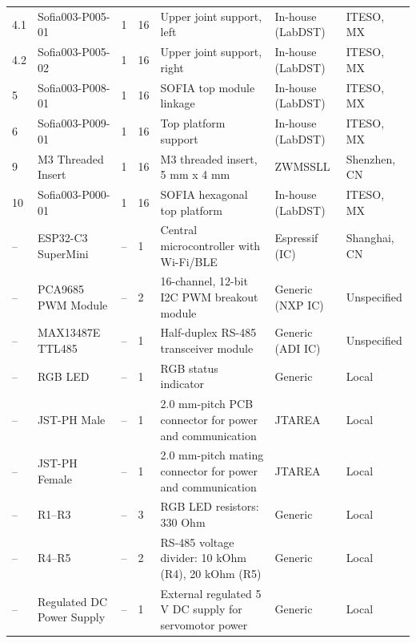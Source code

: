 \documentclass[lettersize,journal]{IEEEtran}
\begin{document}
\begin{table}[!t]
\begin{tabularx}{\columnwidth}{@{}P{0.8cm} P{2.0cm} P{0.5cm} P{0.5cm} P{2.4cm} P{1.1cm} P{0.8cm}@{}}
			4.1 & Sofia003-P005-01 & 1 & 16 &
			Upper joint support, left &
			In-house (LabDST) & ITESO, MX \\
			
			4.2 & Sofia003-P005-02 & 1 & 16 &
			Upper joint support, right &
			In-house (LabDST) & ITESO, MX \\
			
			5 & Sofia003-P008-01 & 1 & 16 &
			SOFIA top module linkage &
			In-house (LabDST) & ITESO, MX \\
			
			6 & Sofia003-P009-01 & 1 & 16 &
			Top platform support &
			In-house (LabDST) & ITESO, MX \\
			
			9 & M3 Threaded Insert & 1 & 16 &
			M3 threaded insert, 5 mm x 4 mm &
			ZWMSSLL & Shenzhen, CN \\
			
			10 & Sofia003-P000-01 & 1 & 16 &
			SOFIA hexagonal top platform &
			In-house (LabDST) & ITESO, MX \\
			
			\midrule
			
			-- & ESP32-C3 SuperMini & -- & 1 &
			Central microcontroller with Wi-Fi/BLE &
			Espressif (IC) & Shanghai, CN \\
			
			-- & PCA9685 PWM Module & -- & 2 &
			16-channel, 12-bit I2C PWM breakout module &
			Generic (NXP IC) & Unspecified \\
			
			-- & MAX13487E TTL485 & -- & 1 &
			Half-duplex RS-485 transceiver module &
			Generic (ADI IC) & Unspecified \\
			
			-- & RGB LED & -- & 1 &
			RGB status indicator &
			Generic & Local \\
			
			-- & JST-PH Male & -- & 1 &
			2.0 mm-pitch PCB connector for power
			and communication &
			JTAREA & Local \\
			
			-- & JST-PH Female & -- & 1 &
			2.0 mm-pitch mating connector for power
			and communication &
			JTAREA & Local \\
			
			-- & R1--R3 & -- & 3 &
			RGB LED resistors: 330 Ohm &
			Generic & Local \\
			
			-- & R4--R5 & -- & 2 &
			RS-485 voltage divider:
			10 kOhm (R4), 20 kOhm (R5) &
			Generic & Local \\
			
			-- & Regulated DC Power Supply & -- & 1 &
			External regulated 5 V DC supply
			for servomotor power &
			Generic & Local \\
			
			\bottomrule
		\end{tabularx}
	\end{table}
	
\end{document}
